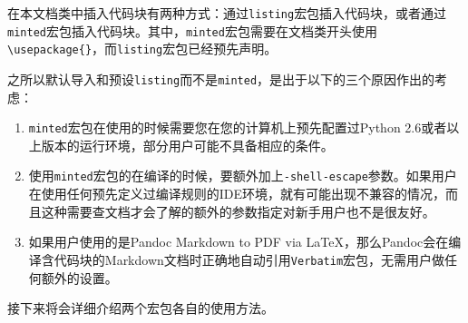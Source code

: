 在本文档类中插入代码块有两种方式：通过\texttt{listing}宏包插入代码块，或者通过\texttt{minted}宏包插入代码块。其中，\texttt{minted}宏包需要在文档类开头使用\texttt{\textbackslash usepackage\{\}}，而\texttt{listing}宏包已经预先声明。

\begin{remark}
  之所以默认导入和预设\texttt{listing}而不是\texttt{minted}，是出于以下的三个原因作出的考虑：
  \begin{enumerate}
    \item \texttt{minted}宏包在使用的时候需要您在您的计算机上预先配置过Python 2.6或者以上版本的运行环境，部分用户可能不具备相应的条件。
    \item 使用\texttt{minted}宏包的在编译的时候，要额外加上\texttt{-shell-escape}参数。如果用户在使用任何预先定义过编译规则的IDE环境，就有可能出现不兼容的情况，而且这种需要查文档才会了解的额外的参数指定对新手用户也不是很友好。
    \item 如果用户使用的是Pandoc Markdown to PDF via \LaTeX{}，那么Pandoc会在编译含代码块的Markdown文档时正确地自动引用\texttt{Verbatim}宏包，无需用户做任何额外的设置。
  \end{enumerate}
\end{remark}

接下来将会详细介绍两个宏包各自的使用方法。